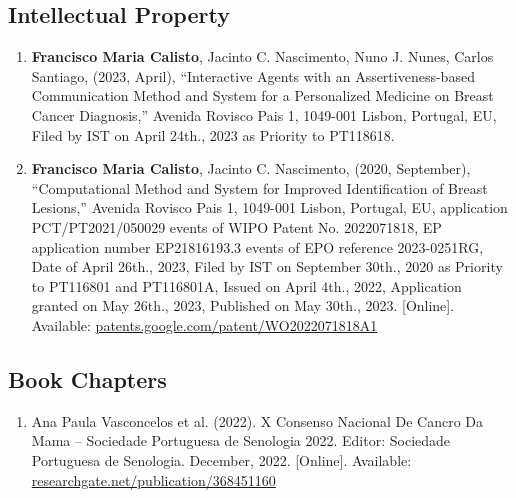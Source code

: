 \subsection{Intellectual Property}
\label{sec:chap00100603}

\begin{enumerate}
\item {\bf Francisco Maria Calisto}, Jacinto C. Nascimento, Nuno J. Nunes, Carlos Santiago, (2023, April), ``Interactive Agents with an Assertiveness-based Communication Method and System for a Personalized Medicine on Breast Cancer Diagnosis,'' Avenida Rovisco Pais 1, 1049-001 Lisbon, Portugal, \acf{EU}, Filed by \acf{IST} on April 24th., 2023 as Priority to PT118618.
\item {\bf Francisco Maria Calisto}, Jacinto C. Nascimento, (2020, September), ``Computational Method and System for Improved Identification of Breast Lesions,'' Avenida Rovisco Pais 1, 1049-001 Lisbon, Portugal, \acf{EU}, application PCT/PT2021/050029 events of \acf{WIPO} Patent No. 2022071818, \acf{EP} application number EP21816193.3 events of \acf{EPO} reference 2023-0251RG, Date of April 26th., 2023, Filed by \acf{IST} on September 30th., 2020 as Priority to PT116801 and PT116801A, Issued on April 4th., 2022, Application granted on May 26th., 2023, Published on May 30th., 2023. [Online]. Available: \href{https://patents.google.com/patent/WO2022071818A1}{patents.google.com/patent/WO2022071818A1}
\end{enumerate}

\subsection{Book Chapters}
\label{sec:chap00100604}

\begin{enumerate}
\item Ana Paula Vasconcelos et al. (2022). X Consenso Nacional De Cancro Da Mama -- Sociedade Portuguesa de Senologia 2022. Editor: Sociedade Portuguesa de Senologia. December, 2022. [Online]. Available: \href{https://www.researchgate.net/publication/368451160}{researchgate.net/publication/368451160}
\end{enumerate}